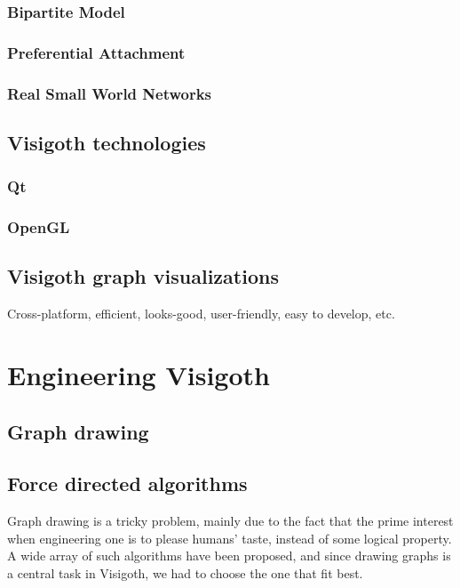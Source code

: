 \documentclass[a4paper,11pt,titlepage]{article}
\let\stdsection\section         %
\renewcommand{\section}{\newpage\stdsection}
\begin{document}
\subsubsection{Bipartite Model}

\subsubsection{Preferential Attachment}

\subsubsection{Real Small World Networks}

\subsection{Visigoth technologies}

\subsubsection{Qt}

\subsubsection{OpenGL}

\subsection{Visigoth graph visualizations}

Cross-platform, efficient, looks-good, user-friendly, easy to develop,
etc.

\section{Engineering Visigoth}

\subsection{Graph drawing}

\subsection{Force directed algorithms}
Graph drawing is a tricky problem, mainly due to the fact that the prime interest when
engineering one is to please humans' taste, instead of some logical property. A wide array
of such algorithms have been proposed, and since drawing graphs is a central task in
Visigoth, we had to choose the one that fit best.
\end{document}
